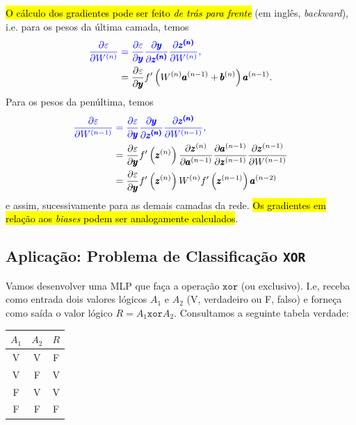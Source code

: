 \hl{O cálculo dos gradientes pode ser feito \emph{de trás para frente}} (em inglês, \textit{backward}), i.e. para os pesos da última camada, temos
\begin{align}
  \color{blue}\frac{\partial\varepsilon}{\partial W^{(n)}} &\color{blue}= \frac{\partial\varepsilon}{\partial\pmb{y}}\frac{\partial\pmb{y}}{\partial\pmb{z^{(n)}}}\frac{\partial\pmb{z^{(n)}}}{\partial W^{(n)}},\\
                             &= \frac{\partial\varepsilon}{\partial\pmb{y}}f'\left(W^{(n)}\pmb{a}^{(n-1)}+\pmb{b}^{(n)}\right)\pmb{a}^{(n-1)}.
\end{align}
Para os pesos da penúltima, temos
\begin{align}
  \color{blue}\frac{\partial\varepsilon}{\partial W^{(n-1)}} &\color{blue}= \frac{\partial\varepsilon}{\partial\pmb{y}}\frac{\partial\pmb{y}}{\partial\pmb{z^{(n)}}}\frac{\partial\pmb{z^{(n)}}}{\partial W^{(n-1)}},\\
                                     &= \frac{\partial\varepsilon}{\partial\pmb{y}}f'\left(\pmb{z}^{(n)}\right)\frac{\partial\pmb{z}^{(n)}}{\partial\pmb{a}^{(n-1)}}\frac{\partial\pmb{a}^{(n-1)}}{\partial\pmb{z}^{(n-1)}}\frac{\partial\pmb{z}^{(n-1)}}{\partial W^{(n-1)}}\\
                                     &= \frac{\partial\varepsilon}{\partial\pmb{y}}f'\left(\pmb{z}^{(n)}\right)W^{(n)}f'\left(\pmb{z}^{(n-1)}\right)\pmb{a}^{(n-2)}
\end{align}
e assim, sucessivamente para as demais camadas da rede. \hl{Os gradientes em relação aos \textit{biases} podem ser analogamente calculados}.

\subsection{Aplicação: Problema de Classificação \texttt{XOR}}

Vamos desenvolver uma MLP que faça a operação $\texttt{xor}$ (ou exclusivo). I.e, receba como entrada dois valores lógicos $A_1$ e $A_2$ (V, verdadeiro ou F, falso) e forneça como saída o valor lógico $R = A_1 \texttt{xor} A_2$. Consultamos a seguinte tabela verdade:

\begin{center}
  \begin{tabular}{cc|c}
    $A_1$ & $A_2$ & $R$\\\hline
    V & V & F\\
    V & F & V\\
    F & V & V\\
    F & F & F\\\hline
  \end{tabular}
\end{center}

